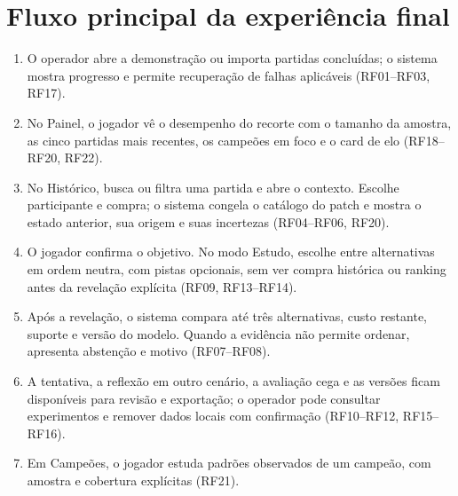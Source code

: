 \documentclass[12pt,a4paper]{article}
\begin{document}
\section{Fluxo principal da experiência final}
\begin{enumerate}
  \item O operador abre a demonstração ou importa partidas concluídas; o sistema mostra
  progresso e permite recuperação de falhas aplicáveis (RF01--RF03, RF17).
  \item No Painel, o jogador vê o desempenho do recorte com o tamanho da amostra, as cinco
  partidas mais recentes, os campeões em foco e o card de elo (RF18--RF20, RF22).
  \item No Histórico, busca ou filtra uma partida e abre o contexto. Escolhe participante e
  compra; o sistema congela o catálogo do patch e mostra o estado anterior, sua origem e
  suas incertezas (RF04--RF06, RF20).
  \item O jogador confirma o objetivo. No modo Estudo, escolhe entre alternativas em ordem
  neutra, com pistas opcionais, sem ver compra histórica ou ranking antes da revelação
  explícita (RF09, RF13--RF14).
  \item Após a revelação, o sistema compara até três alternativas, custo restante, suporte
  e versão do modelo. Quando a evidência não permite ordenar, apresenta abstenção e motivo
  (RF07--RF08).
  \item A tentativa, a reflexão em outro cenário, a avaliação cega e as versões ficam
  disponíveis para revisão e exportação; o operador pode consultar experimentos e remover
  dados locais com confirmação (RF10--RF12, RF15--RF16).
  \item Em Campeões, o jogador estuda padrões observados de um campeão, com amostra e
  cobertura explícitas (RF21).
\end{enumerate}
\end{document}
